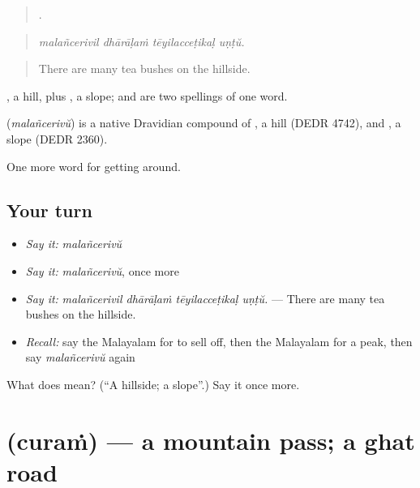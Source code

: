 \begin{quote}
   .
\end{quote}

\begin{quote}
\emph{malañcerivil dhārāḷaṁ tēyilacceṭikaḷ uṇṭŭ.}
\end{quote}

\begin{quote}
There are many tea bushes on the hillside.
\end{quote}

, a hill, plus , a slope;  and  are two spellings of one word.

\begin{cousinweb}
\textbf{} (\emph{malañcerivŭ}) is a native Dravidian compound of , a hill (DEDR 4742), and , a slope (DEDR 2360).
\end{cousinweb}

\begin{grammarlens}[title={What you've built}]
One more word for getting around.
\end{grammarlens}

\subsection*{Your turn}
\begin{itemize}
\raggedright
  \item \emph{Say it:} \emph{malañcerivŭ}
  \item \emph{Say it:} \emph{malañcerivŭ}, once more
  \item \emph{Say it:} \emph{malañcerivil dhārāḷaṁ tēyilacceṭikaḷ uṇṭŭ.} — There are many tea bushes on the hillside.
  \item \emph{Recall:} say the Malayalam for to sell off, then the Malayalam for a peak, then say \emph{malañcerivŭ} again
\end{itemize}

\begin{tcolorbox}[breakable,colback=teal!4,colframe=teal!35!black,title={Before you move on}]
What does  mean? (\textquotedblleft{}A hillside; a slope\textquotedblright{}.) Say it once more.
\end{tcolorbox}
\section[\texorpdfstring{\ml{ചുരം} (curaṁ)}{ചുരം (curaṁ)}]{ (curaṁ) — a mountain pass; a ghat road}

